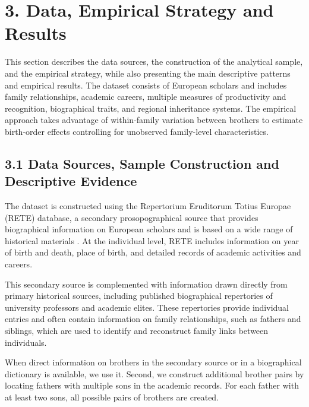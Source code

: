 \setcounter{section}{5}
\section*{3. Data, Empirical Strategy and Results}

This section describes the data sources, the construction of the analytical sample, and the empirical strategy, while also presenting the main descriptive patterns and empirical results. The dataset consists of European scholars and includes family relationships, academic careers, multiple measures of productivity and recognition, biographical traits, and regional inheritance systems. The empirical approach takes advantage of within-family variation between brothers to estimate birth-order effects controlling for unobserved family-level characteristics.

\subsection*{3.1 Data Sources, Sample Construction and Descriptive Evidence}

The dataset is constructed using the Repertorium Eruditorum Totius Europae (RETE) database, a secondary prosopographical source that provides biographical information on European scholars and is based on a wide range of historical materials \citep{curtis2026academic}. At the individual level, RETE includes information on year of birth and death, place of birth, and detailed records of academic activities and careers.

This secondary source is complemented with information drawn directly from primary historical sources, including published biographical repertories of university professors and academic elites. These repertories provide individual entries and often contain information on family relationships, such as fathers and siblings, which are used to identify and reconstruct family links between individuals.

When direct information on brothers in the secondary source or in a biographical dictionary is available, we use it. Second, we construct additional brother pairs by locating fathers with multiple sons in the academic records. For each father with at least two sons, all possible pairs of brothers are created.

